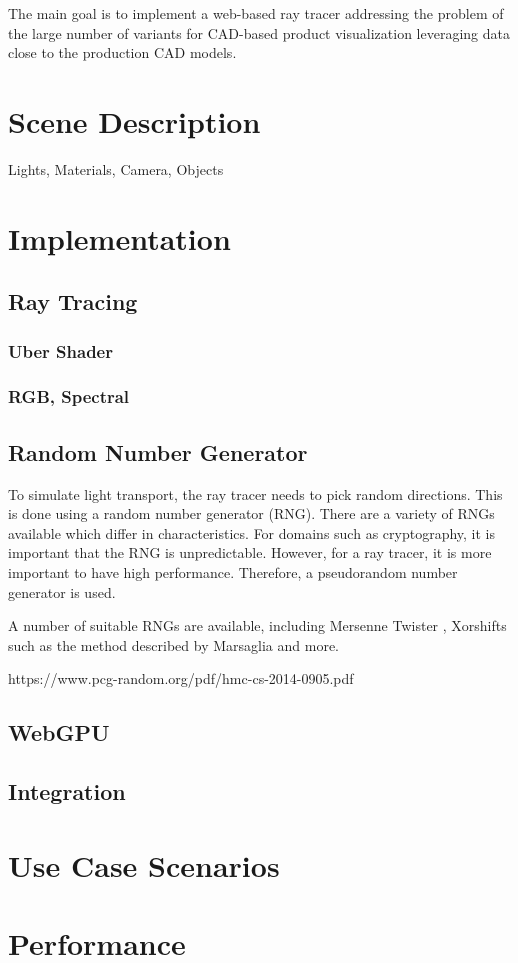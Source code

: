 
The main goal is to implement a web-based ray tracer addressing the problem of the large number of variants for CAD-based product visualization leveraging data close to the production CAD models.

\section{Scene Description}
Lights, Materials, Camera, Objects
\section{Implementation}
\subsection{Ray Tracing}
\subsubsection{Uber Shader}
\subsubsection{RGB, Spectral}
\subsection{Random Number Generator}

To simulate light transport, the ray tracer needs to pick random directions. This is done using a random number generator (RNG). There are a variety of RNGs available which differ in characteristics. For domains such as cryptography, it is important that the RNG is unpredictable. However, for a ray tracer, it is more important to have high performance. Therefore, a pseudorandom number generator is used.

A number of suitable RNGs are available, including Mersenne Twister \cite{rngMersenneTwister}, Xorshifts such as the method described by Marsaglia \cite{marsaglia2003xorshift} and more.

https://www.pcg-random.org/pdf/hmc-cs-2014-0905.pdf

\subsection{WebGPU}
\subsection{Integration}
\section{Use Case Scenarios}
\section{Performance}